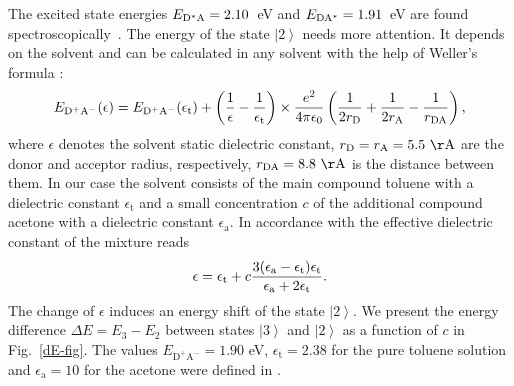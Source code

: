 \documentclass[12pt,twoside,a4paper]{report}
\begin{document}
The excited state energies
$E_{\rm D^*A  }=2.10$~eV and 
$E_{\rm D  A^*}=1.91$~eV are found spectroscopically~\cite{r4}. 
The energy of the state 
$\left| 2 \right>$
needs
more attention. 
It depends 
on the solvent and can be calculated in any solvent with the help of 
Weller's formula \cite{well82}:  
\begin{eqnarray} 
E
_{{\rm D^{+}A^{-}}}
      ({\epsilon })
                    =
                        E
                        _{\rm {D^{+}A^{-}}}
                        ({\epsilon _{\rm{t}}})
                     +  \left( 
                            \frac 1{{\epsilon }}-\frac 1{{\epsilon _{\mathrm{t}}}}
                        \right) 
                        \times 
                        \frac
                            {e^2}
                            {4\pi \epsilon _0}
                        \left( 
                             \frac 
                                 1
                                 {2r_{\rm D }}
                           + \frac 
                                 1
                                 {2r_{\rm A}}
                           - \frac 
                                 1
                                 {r_{\rm DA}}
                        \right) ,  \label{E(eps)} 
\end{eqnarray} 
where {$\epsilon $} denotes the solvent static dielectric constant, 
$r_{\rm D}=r_{\rm A}=5.5~{\rm \AA}$ are the donor and  acceptor radius, 
respectively, $r_{\rm DA}=8.8~{\rm \AA}$ is the distance between them. 
In our case the solvent consists of the main compound toluene 
with a dielectric constant  ${\epsilon _{\mathrm{t}}}$ and 
a small concentration {$c$} of the  additional compound 
acetone with a dielectric constant ${\epsilon _{\mathrm{a}}}$. In 
accordance with \cite{land85} the effective dielectric constant of the 
mixture reads  
\begin{equation} 
\epsilon 
         =
             \epsilon_{\rm t }
          +  c
             \frac
                {  
                  3(
                       \epsilon_{\rm a}
                     - \epsilon_{\rm t}
                   )
                   \epsilon_{\rm t}
                }
                {
                     \epsilon_{\rm a}
                 + 2 
                     \epsilon_{\rm t}
                }.  \label{mixture} 
\end{equation} 
The change of $\epsilon$
induces an energy shift
of the state 
$\left| 2 \right>$.
We present the energy difference 
$\Delta E=E_3-E_2$
between states 
$\left| 3 \right>$
and
$\left| 2 \right>$
as a function of $c$
in Fig.~\ref{dE-fig}.
%
\normalsize
The values $E_{\mathrm{D^{+}A^{-}}}=1.90$ eV, ${\epsilon _{\mathrm{t}}=2.38}$ 
for the pure toluene solution and ${\epsilon _{\mathrm{a}}=10}$ for the 
acetone were defined in \cite{will98}. 
 
\end{document}
